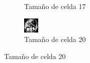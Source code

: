 \documentclass[a4paper]{article}
\begin{document}
\begin{figure}
\begin{subfigure}{0.4\linewidth}
  \caption{Tamaño de celda 17}
\end{subfigure}%
\begin{subfigure}{0.4\linewidth}
  \centering
  \includegraphics[width=0.6\linewidth]{celdas/tomo2-20-0}
  \caption{Tamaño de celda 20}
\end{subfigure}%


\end{figure}
\end{document}
